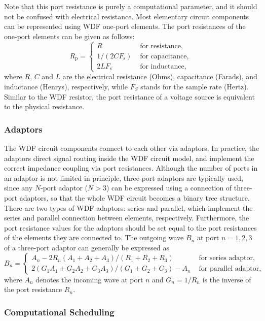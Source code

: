 \documentclass[10pt,a4paper,oneside]{article}
\begin{document}
Note that this port resistance is purely a computational parameter, and it should not be confused
with electrical resistance. Most elementary circuit components can be represented using WDF one-port elements. The port resistances of the one-port elements can be given as follows:
\[
R_{\mathrm{p}}=\left\{\begin{array}{ll}{R} & {\text { for resistance,}} \\ {1 /\left(2 C F_{\mathrm{s}}\right)} & {\text { for capacitance, }} \\ {2 L F_{\mathrm{s}}} & {\text { for inductance, }}\end{array}\right.
\]
where $R$, $C$ and $L$ are the electrical resistance (Ohms), capacitance (Farads), and inductance (Henrys), respectively, while $F_S$ stands for the sample rate (Hertz). Similar to the WDF resistor, the port resistance of a voltage source is equivalent to the physical resistance.
\subsubsection{Adaptors}
The WDF circuit components connect to each other via adaptors. In practice, the adaptors direct signal routing inside the WDF circuit model, and implement the correct impedance coupling via port resistances. Although the number of ports in an adaptor is not limited in principle, three-port adaptors are typically used, since any $N$-port adaptor ($N > 3$) can be expressed using a connection of three-port adaptors, so that the whole WDF circuit becomes a binary tree structure. There are two types of WDF adaptors: series and parallel, which implement the series and parallel connection between elements, respectively. Furthermore, the port resistance values for the adaptors should be set equal to the port resistances of the elements they are connected to. The outgoing wave $B_n$ at port $n = 1, 2, 3$ of a three-port adaptor can generally be expressed as
\[
B_{n}=\left\{\begin{array}{ll}{A_{n}-2 R_{n}\left(A_{1}+A_{2}+A_{3}\right) /\left(R_{1}+R_{2}+R_{3}\right)} & {\text { for series adaptor, }} \\ {2\left(G_{1} A_{1}+G_{2} A_{2}+G_{3} A_{3}\right) /\left(G_{1}+G_{2}+G_{3}\right)-A_{n}} & {\text { for parallel adaptor, }}\end{array}\right.
\]
where $A_n$ denotes the incoming wave at port $n$ and $G_n=1/R_n$ is the inverse of the port resistance $R_n$.
\subsubsection{Computational Scheduling}
\end{document}
